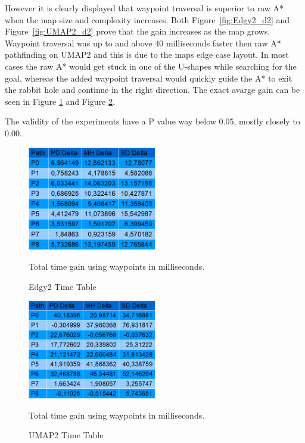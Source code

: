 \documentclass[a4paper]{article}
\begin{document}
However it is clearly displayed that waypoint traversal is superior to raw A* when the map size and complexity increases. Both Figure~\ref{fig:Edgy2_d2} and Figure~\ref{fig:UMAP2_d2} prove that the gain increases as the map grows.
Waypoint traversal was up to and above 40 milliseconds faster then raw A* pathfinding on UMAP2 and this is due to the maps edge case layout. In most cases the raw A* would get stuck in one of the U-shapes while searching for the goal, whereas the added waypoint traversal would quickly guide the A* to exit the rabbit hole and continue in the right direction. The exact avarge gain can be seen in Figure \ref{fig:Edgy2_cd} and Figure \ref{fig:UMAP2_cd}.
	
The validity of the experiments have a P value way below 0.05, mostly closely to 0.00.

\begin{figure}[h!]
\centering
\includegraphics[width=0.5\textwidth,height=\textheight,keepaspectratio]{ChartsAndFigures/Edgy2_timeTable.png}
\caption{Edgy2 Time Table}
Total time gain using waypoints in milliseconds.
\label{fig:Edgy2_cd}
\end{figure}
\begin{figure}[h!]
\centering
\includegraphics[width=0.5\textwidth,height=\textheight,keepaspectratio]{ChartsAndFigures/UMAP2_timeTable.png}
\caption{UMAP2 Time Table}
Total time gain using waypoints in milliseconds.
\label{fig:UMAP2_cd}
\end{figure}
\end{document}

